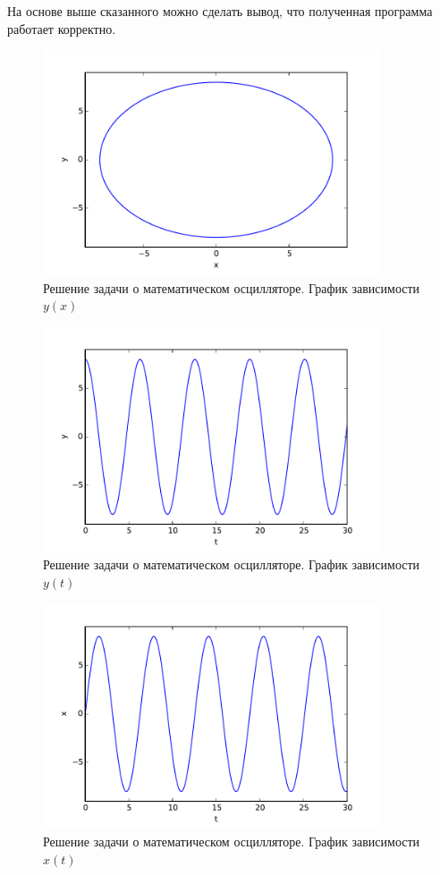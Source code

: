 \documentclass[a4paper,14pt]{article}
\begin{document}
На основе выше сказанного можно сделать вывод, что полученная программа работает корректно.
\newpage
\begin{figure}[H]
\centering
    \includegraphics[width=100mm]{pictures/x-y.pdf}
    \caption{Решение задачи о математическом осцилляторе. График зависимости $y(x)$}
    \label{x-y}
\end{figure}
\begin{figure}[H]
\centering
    \includegraphics[width=100mm]{pictures/t-y.pdf}
    \caption{Решение задачи о математическом осцилляторе. График зависимости $y(t)$}
    \label{t-y} 
\end{figure}
\begin{figure}[H]
\centering
    \includegraphics[width=100mm]{pictures/t-x.pdf}
    \caption{Решение задачи о математическом осцилляторе. График зависимости $x(t)$}
    \label{t-x}
\end{figure}
\end{document}
